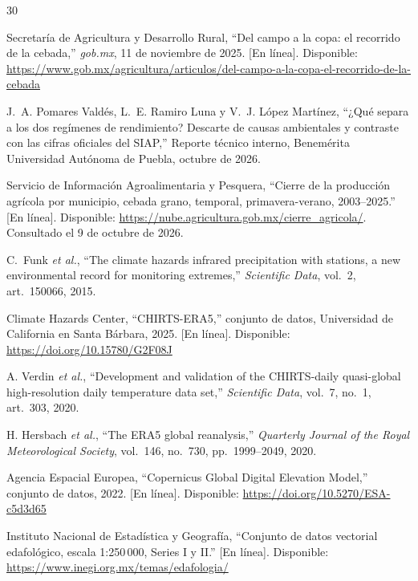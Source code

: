 \begin{thebibliography}{30}

Secretaría de Agricultura y Desarrollo Rural, ``Del campo a la copa: el recorrido de la cebada,'' \emph{gob.mx}, 11 de
noviembre de 2025. [En línea]. Disponible:
\url{https://www.gob.mx/agricultura/articulos/del-campo-a-la-copa-el-recorrido-de-la-cebada}

J.~A. Pomares Valdés, L.~E. Ramiro Luna y V.~J. López Martínez, ``¿Qué separa a los dos regímenes de rendimiento?
Descarte de causas ambientales y contraste con las cifras oficiales del SIAP,'' Reporte técnico interno, Benemérita
Universidad Autónoma de Puebla, octubre de 2026.

Servicio de Información Agroalimentaria y Pesquera, ``Cierre de la producción agrícola por municipio, cebada grano,
temporal, primavera-verano, 2003--2025.'' [En línea]. Disponible: \url{https://nube.agricultura.gob.mx/cierre_agricola/}.
Consultado el 9 de octubre de 2026.

C.~Funk \emph{et al.}, ``The climate hazards infrared precipitation with stations, a new environmental record for
monitoring extremes,'' \emph{Scientific Data}, vol.~2, art.~150066, 2015.

Climate Hazards Center, ``CHIRTS-ERA5,'' conjunto de datos, Universidad de California en Santa Bárbara, 2025.
[En línea]. Disponible: \url{https://doi.org/10.15780/G2F08J}

A. Verdin \emph{et al.}, ``Development and validation of the CHIRTS-daily quasi-global high-resolution daily
temperature data set,'' \emph{Scientific Data}, vol.~7, no.~1, art.~303, 2020.

H. Hersbach \emph{et al.}, ``The ERA5 global reanalysis,'' \emph{Quarterly Journal of the Royal Meteorological
Society}, vol.~146, no.~730, pp.~1999--2049, 2020.

Agencia Espacial Europea, ``Copernicus Global Digital Elevation Model,'' conjunto de datos, 2022. [En línea].
Disponible: \url{https://doi.org/10.5270/ESA-c5d3d65}

Instituto Nacional de Estadística y Geografía, ``Conjunto de datos vectorial edafológico, escala 1:250\,000, Series I
y II.'' [En línea]. Disponible: \url{https://www.inegi.org.mx/temas/edafologia/}


\end{thebibliography}
